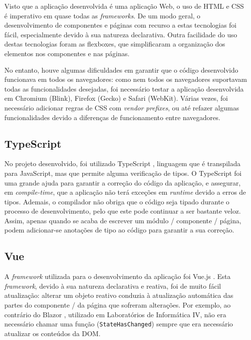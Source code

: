 \documentclass[12pt, a4paper]{article}
\begin{document}
Visto que a aplicação desenvolvida é uma aplicação Web, o uso de HTML e CSS é imperativo em quase
todas as \emph{frameworks}. De um modo geral, o desenvolvimento de componentes e páginas com recurso
a estas tecnologias foi fácil, especialmente devido à sua natureza declarativa. Outra facilidade do
uso destas tecnologias foram as flexboxes, que simplificaram a organização dos elementos nos
componentes e nas páginas.

No entanto, houve algumas dificuldades em garantir que o código desenvolvido funcionava em todos os
navegadores: como nem todos os navegadores suportavam todas as funcionalidades desejadas, foi
necessário testar a aplicação desenvolvida em Chromium (Blink), Firefox (Gecko) e Safari (WebKit).
Várias vezes, foi necessário adicionar regras de CSS com \emph{vendor prefixes}, ou até refazer
algumas funcionalidades devido a diferenças de funcionamento entre navegadores.

\subsection{TypeScript}


No projeto desenvolvido, foi utilizado TypeScript \cite{typescript}, linguagem que é transpilada
para JavaScript, mas que permite alguma verificação de tipos. O TypeScript foi uma grande ajuda para
garantir a correção do código da aplicação, e assegurar, em \emph{compile-time}, que a aplicação não
terá exceções em \emph{runtime} devido a erros de tipos. Ademais, o compilador não obriga que o
código seja tipado durante o processo de desenvolvimento, pelo que este pode continuar a ser
bastante veloz. Assim, apenas quando se acaba de escrever um módulo / componente / página, podem
adicionar-se anotações de tipo ao código para garantir a sua correção.

\subsection{Vue}

A \emph{framework} utilizada para o desenvolvimento da aplicação foi Vue.js \cite{vue}. Esta
\emph{framework}, devido à sua natureza declarativa e reativa, foi de muito fácil atualização:
alterar um objeto reativo conduzia à atualização automática das partes do componente / da página que
sofreram alterações. Por exemplo, ao contrário do Blazor \cite{blazor}, utilizado em Laboratórios de
Informática IV, não era necessário chamar uma função (\texttt{StateHasChanged}) sempre que era
necessário atualizar os conteúdos da DOM.
\end{document}
